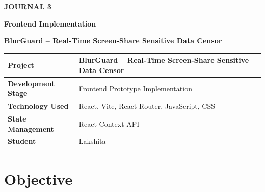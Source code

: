 \documentclass[12pt,a4paper]{article}
\begin{document}

\begin{center}

{\bfseries\fontsize{14}{16}\selectfont JOURNAL 3}

\vspace{3pt}

{\bfseries\fontsize{11}{13}\selectfont Frontend Implementation}

\vspace{3pt}

{\bfseries\fontsize{10.5}{13}\selectfont
BlurGuard -- Real-Time Screen-Share Sensitive Data Censor}

\end{center}

\vspace{5pt}


\begin{center}
\renewcommand{\arraystretch}{1.15}

\begin{tabular}{|p{3.8cm}|p{12.4cm}|}
\hline

\textbf{Project}
&
BlurGuard -- Real-Time Screen-Share Sensitive Data Censor
\\
\hline

\textbf{Development Stage}
&
Frontend Prototype Implementation
\\
\hline

\textbf{Technology Used}
&
React, Vite, React Router, JavaScript, CSS
\\
\hline

\textbf{State Management}
&
React Context API
\\
\hline

\textbf{Student}
&
Lakshita
\\
\hline

\end{tabular}
\end{center}

\vspace{3pt}


\section{Objective}
\end{document}
